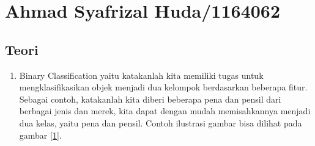 \section{Ahmad Syafrizal Huda/1164062}
\subsection{Teori}
\begin{enumerate}
\item Binary Classification yaitu katakanlah kita memiliki tugas untuk mengklasifikasikan objek menjadi dua kelompok berdasarkan beberapa fitur. Sebagai contoh, katakanlah kita diberi beberapa pena dan pensil dari berbagai jenis dan merek, kita dapat dengan mudah memisahkannya menjadi dua kelas, yaitu pena dan pensil.
\subitem Contoh ilustrasi gambar bisa dilihat pada gambar \ref{1}.


\end{enumerate}
